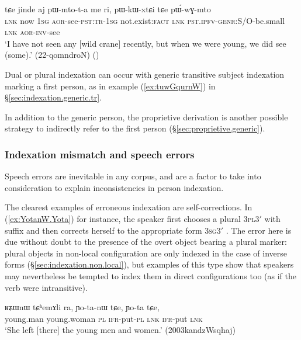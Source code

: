 \begin{exe}
\ex   \label{ex:pWkWxtCi.tCe.pWwGmto}
 \gll tɕe jinde aj pɯ-mto-t-a me ri, pɯ-kɯ-xtɕi tɕe pɯ́-wɣ-mto \\
 \textsc{lnk} now \textsc{1sg} \textsc{aor}-see-\textsc{pst}:\textsc{tr}-\textsc{1sg} not.exist:\textsc{fact} \textsc{lnk} \textsc{pst}.\textsc{ipfv}-\textsc{genr}:S/O-be.small \textsc{lnk} \textsc{aor}-\textsc{inv}-see \\
\glt `I have not seen any [wild crane] recently, but when we were young, we did see (some).' (22-qomndroN) 
()
\end{exe}

Dual or plural indexation can occur with generic transitive subject indexation marking a first person, as in example (\ref{ex:tuwGqurnW}) in §\ref{sec:indexation.generic.tr}.

In addition to the generic person, the proprietive derivation is another possible strategy to indirectly refer to the first person (§\ref{sec:proprietive.generic}).
 
\subsubsection{Indexation mismatch and speech errors} \label{sec:mismatch.errors}
Speech errors are inevitable in any corpus, and are a factor to take into consideration to explain inconsistencies in person indexation. 

The clearest examples of erroneous indexation are self-corrections. In (\ref{ex:YotanW.Yota}) for instance, the speaker first chooses a plural \textsc{3pl}\fl{}3$'$ with  suffix and then corrects herself to the appropriate form \textsc{3sg}\fl{}3$'$ . The error here is due without doubt to the presence of the overt object  bearing a plural marker: plural objects in non-local configuration are only indexed in the case of inverse forms (§\ref{sec:indexation.non.local}), but examples of this type show that speakers may nevertheless be tempted to index them in direct configurations too (as if the verb were intransitive).

\begin{exe}
\ex \label{ex:YotanW.Yota}
\gll  ʁʑɯnɯ tɕʰemɤli ra, ɲo-ta-nɯ tɕe, ɲo-ta tɕe, \\
young.man young.woman \textsc{pl} \textsc{ifr}-put-\textsc{pl} \textsc{lnk} \textsc{ifr}-put \textsc{lnk} \\
\glt `She left [there] the young men and women.' (2003kandzWsqhaj)
\end{exe} 

